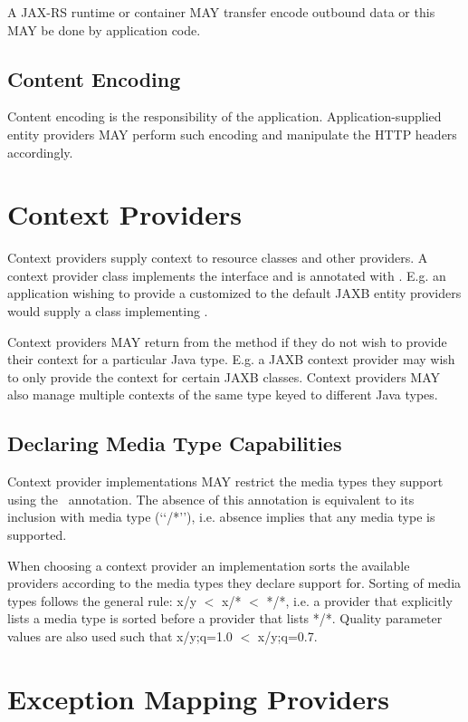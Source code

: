 A JAX-RS runtime or container MAY transfer encode outbound data or this MAY be done by application code.

\subsection{Content Encoding}

Content encoding is the responsibility of the application. Application-supplied entity providers MAY perform such encoding and manipulate the HTTP headers accordingly.

\section{Context Providers}
\label{contextprovider}

Context providers supply context to resource classes and other providers. A context provider class implements the  interface and is annotated with \Provider. E.g. an application wishing to provide a customized  to the default JAXB entity providers would supply a class implementing .

Context providers MAY return  from the  method if they do not wish to provide their context for a particular Java type. E.g. a JAXB context provider may wish to only provide the context for certain JAXB classes. Context providers MAY also manage multiple contexts of the same type keyed to different Java types.

\subsection{Declaring Media Type Capabilities}

Context provider implementations MAY restrict the media types they support using the \Produces\ annotation. The absence of this annotation is equivalent to its inclusion with media type (\lq\lq*/*\rq\rq), i.e. absence implies that any media type is supported.

When choosing a context provider an implementation sorts the available providers according to the media types they declare support for. Sorting of media types follows the general rule: x/y $<$ x/* $<$ */*, i.e. a provider that explicitly lists a media type is sorted before a provider that lists */*. Quality parameter values are also used such that x/y;q=1.0 $<$ x/y;q=0.7.

\section{Exception Mapping Providers}
\label{exceptionmapper}

